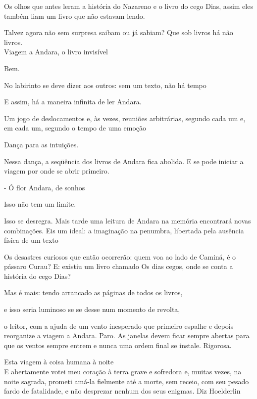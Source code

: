 Os olhos que antes leram a história do Nazareno e o livro do cego Dias,
assim eles também liam um livro que não estavam lendo.

Talvez agora não sem surpresa saibam ou já sabiam? Que sob livros há não
livros.\\

Viagem a Andara, o livro invisível

\pagebreak

Bem.

No labirinto se deve dizer aos outros: sem um texto, não há tempo

E assim, há a maneira infinita de ler Andara.

Um jogo de deslocamentos e, às vezes, reuniões arbitrárias, segundo cada
um e, em cada um, segundo o tempo de uma emoção

Dança para as intuições.

\pagebreak

Nessa dança, a seqüência dos livros de Andara fica abolida. E se pode
iniciar a viagem por onde se abrir primeiro.

- Ó flor Andara, de sonhos

Isso não tem um limite.

Isso se desregra. Mais tarde uma leitura de Andara na memória encontrará
novas combinações. Eis um ideal: a imaginação na penumbra, libertada
pela ausência física de um texto

Os desastres curiosos que então ocorrerão: quem voa ao lado de Caminá, é
o pássaro Curau? E: existiu um livro chamado Os dias cegos, onde se
conta a história do cego Dias?

Mas é mais: tendo arrancado as páginas de todos os livros,

e isso seria luminoso se se desse num momento de revolta,

o leitor, com a ajuda de um vento inesperado que primeiro espalhe e
depois reorganize a viagem a Andara. Paro. As janelas devem ficar sempre
abertas para que os ventos sempre entrem e nunca uma ordem final se
instale. Rigorosa.

\pagebreak

\clearpage
\thispagestyle{empty}

\movetooddpage

Esta viagem à coisa humana à noite\\

E abertamente votei meu coração à terra grave e sofredora e, muitas
vezes, na noite sagrada, prometi amá-la fielmente até a morte, sem
receio, com seu pesado fardo de fatalidade, e não desprezar nenhum dos
seus enigmas. Diz Hoelderlin

